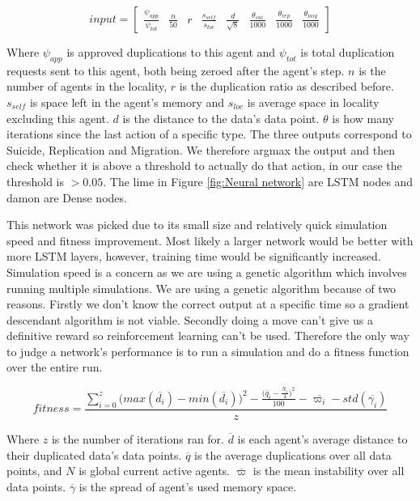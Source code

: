 \documentclass{UoYCSproject}
\begin{document}
\begin{equation}
input = \begin{bmatrix}  \frac{\psi_{app}}{\psi_{tot}} & \frac{n}{50}  & r & \frac{s_{self}}{s_{loc}} &  \frac{d}{\sqrt{8}}  &  \frac{\theta_{sui}}{1000} & \frac{\theta_{rep}}{1000} & \frac{\theta_{mig}}{1000} \end{bmatrix}
\end{equation}

Where $\psi_{app}$ is approved duplications to this agent and $\psi_{tot}$ is total duplication requests sent to this agent, both being zeroed after the agent's step. $n$ is the number of agents in the locality, $r$ is the duplication ratio as described before. $s_{self}$ is space left in the agent's memory and $s_{loc}$ is average space in locality excluding this agent. $d$ is the distance to the data’s data point. $\theta$ is how many iterations since the last action of a specific type. The three outputs correspond to Suicide, Replication and Migration. We therefore argmax the output and then check whether it is above a threshold to actually do that action, in our case the threshold is $>0.05$. The lime in Figure \ref{fig:Neural network} are LSTM nodes and damon are Dense nodes.

This network was picked due to its small size and relatively quick simulation speed and fitness improvement. Most likely a larger network would be better with more LSTM layers, however, training time would be significantly increased. Simulation speed is a concern as we are using a genetic algorithm which involves running multiple simulations. We are using a genetic algorithm because of two reasons. Firstly we don’t know the correct output at a specific time so a gradient descendant algorithm is not viable. Secondly doing a move can’t give us a definitive reward so reinforcement learning can’t be used. Therefore the only way to judge a network's performance is to run a simulation and do a fitness function over the entire run.

\begin{equation}
fitness =  \frac{\sum_{i=0}^{z}{\big(max( \overline{d_{i}}) - min( \overline{d_{i}})\big)^{2} - \frac{\big(  \overline{q}_{i} - \frac{N_{i}}{4} \big)^{2}}{100} } - \overline{ \varpi_{i} } - std(  \overline{\gamma_{i}} )}{z}
\end{equation}

Where $z$ is the number of iterations ran for. $\overline{d}$ is each agent’s average distance to their duplicated data’s data points. $\overline{q}$ is the average duplications over all data points, and $N$ is global current active agents. $\overline{ \varpi }$ is the mean instability over all data points. $\overline{\gamma}$ is the spread of agent's used memory space.
\end{document}
